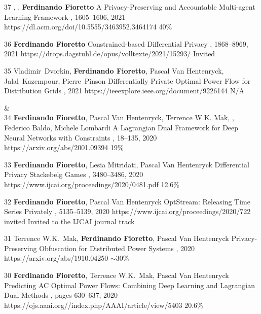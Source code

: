 \begin{pubs}
    \confentry
    {37} %
    {, , {\bf Ferdinando Fioretto}}
    {A Privacy-Preserving and Accountable Multi-agent Learning Framework}
    {\procAAMAS, 1605--1606, 2021}
    {https://dl.acm.org/doi/10.5555/3463952.3464174}
    {40\%}

	\confentry
	{36} %
	{\bf Ferdinando Fioretto}
	{Constrained-based Differential Privacy}
	{\procCP, 1868--8969, 2021}
	{https://drops.dagstuhl.de/opus/volltexte/2021/15293/}
	{Invited}
	
	\confentry 
	{35} %
	{Vladimir~Dvorkin, {\bf Ferdinando Fioretto}, Pascal Van Hentenryck, Jalal~Kazempour, Pierre~Pinson}
	{Differentially Private Optimal Power Flow for Distribution Grids}
	{, 2021}
	{https://ieeexplore.ieee.org/document/9226144}
	{N/A} %

{}&\nemph{\rule{0.5\linewidth}{0.5pt}}\\[1em]
	\confentry
		{34} %
		{{\bf Ferdinando Fioretto}, Pascal Van Hentenryck, Terrence W.K. Mak, , Federico Baldo, Michele Lombardi} 
		{A Lagrangian Dual Framework for Deep Neural Networks with Constraints}
		{\procECML, 18--135, 2020}
		{https://arxiv.org/abs/2001.09394}
		{19\%}

	\confentry
		{33} %
		{{\bf Ferdinando Fioretto}, Lesia Mitridati, Pascal Van Hentenryck}
		{Differential Privacy Stackebelg Games}
		{\procIJCAI, 3480--3486, 2020}
		{https://www.ijcai.org/proceedings/2020/0481.pdf}
	    {12.6\%}

	\confentryAwd
		{32} %
		{{\bf Ferdinando Fioretto}, Pascal Van Hentenryck}
		{OptStream: Releasing Time Series Privately}
		{\procIJCAI, 5135--5139, 2020}
	    {https://www.ijcai.org/proceedings/2020/722}
		{invited}
		{Invited to the IJCAI journal track}{}
	
	\confentry
		{31} %
		{Terrence W.K.~Mak, {\bf Ferdinando Fioretto}, Pascal Van Hentenryck}
		{Privacy-Preserving Obfuscation for Distributed Power Systems}
		{\procPSCC, 2020}
		{https://arxiv.org/abs/1910.04250}
	    {$\sim$30\%} %

	\confentry
		{30} %
		{{\bf Ferdinando Fioretto}, Terrence W.K.~Mak, Pascal Van Hentenryck}
		{Predicting AC Optimal Power Flows: Combining Deep Learning and Lagrangian Dual Methods}
	  	{\procAAAI, pages 630--637, 2020}
	  	{https://ojs.aaai.org//index.php/AAAI/article/view/5403}
	    {20.6\%} %


\end{pubs}

